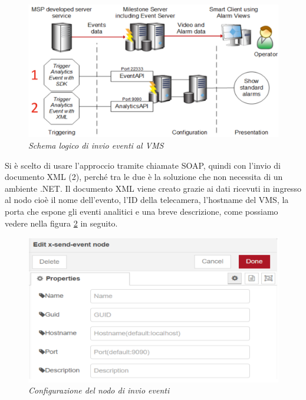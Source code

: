 \documentclass[a4paper, openright, thesis]{report}
\begin{document}
\begin{figure}[H]
    \centering
    \includegraphics[width=1\linewidth]{img/4.png}
    \caption{\textit{Schema logico di invio eventi al VMS}}
    \label{4}
\end{figure}
\noindent
Si è scelto di usare l’approccio tramite chiamate SOAP, quindi con l’invio di documento
XML (2), perché tra le due è la soluzione che non necessita di un ambiente .NET. Il documento XML viene creato grazie ai dati ricevuti in ingresso al nodo cioè il nome
dell’evento, l’ID della telecamera, l’hostname del VMS, la porta che espone gli eventi analitici e una
breve descrizione, come possiamo vedere nella figura \ref{5} in seguito.
\begin{figure}[H]
    \centering
    \includegraphics[width=0.5\linewidth]{img/6.png}
    \caption{\textit{Configurazione del nodo di invio eventi}}
    \label{5}
\end{figure}
\end{document}

